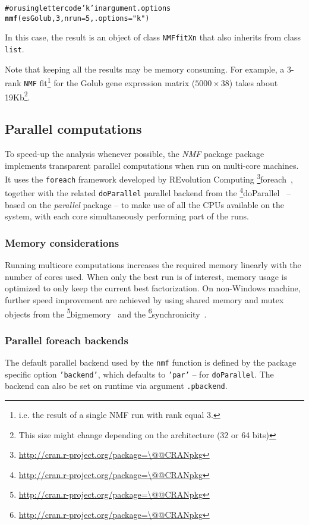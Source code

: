 \documentclass[a4paper]{article}\usepackage{graphicx, color}
\makeatletter
\newcommand{\hlfunctioncall}[1]{\textcolor[rgb]{0.501960784313725,0,0.329411764705882}{\textbf{#1}}}%
\newcommand{\hlstring}[1]{\textcolor[rgb]{0.6,0.6,1}{#1}}%
\newcommand{\hlcomment}[1]{\textcolor[rgb]{0.180392156862745,0.6,0.341176470588235}{#1}}%
\newenvironment{kframe}{%
 \def\at@end@of@kframe{}%
 \ifinner\ifhmode%
  \def\at@end@of@kframe{\end{minipage}}%
  \begin{minipage}{\columnwidth}%
 \fi\fi%
 \def\FrameCommand##1{\hskip\@totalleftmargin \hskip-\fboxsep
 \colorbox{shadecolor}{##1}\hskip-\fboxsep
     \hskip-\linewidth \hskip-\@totalleftmargin \hskip\columnwidth}%
 \MakeFramed {\advance\hsize-\width
   \@totalleftmargin\z@ \linewidth\hsize
   \@setminipage}}%
 {\par\unskip\endMakeFramed%
 \at@end@of@kframe}
\newenvironment{knitrout}{}{} %
\let\code=\texttt
\newcommand{\pkgname}[1]{\textit{#1}\xspace}
\newcommand{\Rpkg}[1]{\pkgname{#1} package\xspace}
\newcommand{\CRANurl}[1]{\url{http://cran.r-project.org/package=#1}}
\def\CRANpkg{\@ifstar\@CRANpkg\@@CRANpkg}
\def\@CRANpkg#1{\href{http://cran.r-project.org/package=#1}{\pkgname{#1}}\footnote{\CRANurl{#1}}}
\def\@@CRANpkg#1{\href{http://cran.r-project.org/package=#1}{\pkgname{#1}} package\footnote{\CRANurl{#1}}}
\newcommand{\citeCRANpkg}[1]{\CRANpkg{#1}~\cite{#1}}
\newcommand{\nmfpack}{\Rpkg{NMF}}
\renewcommand{\cite}[1]{\parencite{#1}}
\makeatother
\begin{document}
\begin{knitrout}
\color{fgcolor}\begin{kframe}
\begin{alltt}
\hlcomment{# or using letter code \hlstring{'k'} in argument .options}
\hlfunctioncall{nmf}(esGolub, 3, nrun = 5, .options = \hlstring{"k"})
\end{alltt}
\end{kframe}
\end{knitrout}


In this case, the result is an object of class \code{NMFfitXn} that also inherits from class \code{list}.

Note that keeping all the results may be memory consuming. 
For example, a 3-rank \code{NMF} fit\footnote{i.e. the result of a single NMF run with rank equal 3.} for the Golub gene expression matrix ($5000 \times 38$) takes about 19Kb\footnote{This size might change depending on the architecture (32 or 64 bits)}.

\subsection{Parallel computations}\label{multicore}

To speed-up the analysis whenever possible, the \nmfpack package implements transparent parallel computations when run on multi-core machines.
It uses the \code{foreach} framework developed by REvolution Computing
\citeCRANpkg{foreach}, together with the related \code{doParallel} parallel
backend from the \citeCRANpkg{doParallel} -- based on the
\pkgname{parallel} package -- to make use of all the CPUs available on the
system, with each core simultaneously performing part of the runs. 

\subsubsection{Memory considerations}
Running multicore computations increases the required memory linearly
with the number of cores used.
When only the best run is of interest, memory usage is
optimized to only keep the current best factorization.
On non-Windows machine, further speed improvement are achieved by using shared
memory and mutex objects from the \citeCRANpkg{bigmemory} and the 
\citeCRANpkg{synchronicity}.

\subsubsection{Parallel foreach backends}
The default parallel backend used by the \code{nmf} function is defined by the
package specific option \code{'backend'}, which defaults to \code{'par'} -- for
\code{doParallel}.
The backend can also be set on runtime via argument \code{.pbackend}.
\end{document}
